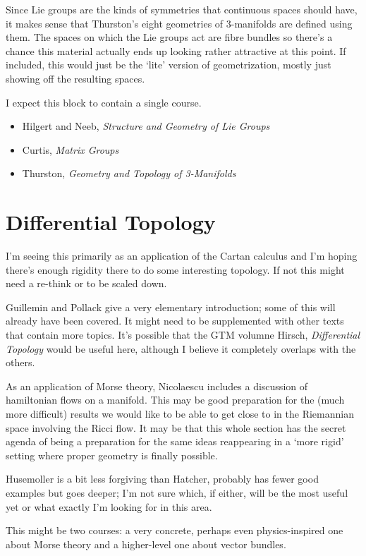\documentclass[article]{article}
\begin{document}
Since Lie groups are the kinds of symmetries that continuous spaces should have, it makes sense that Thurston's eight geometries of 3-manifolds are defined using them. The spaces on which the Lie groups act are fibre bundles so there's a chance this material actually ends up looking rather attractive at this point. If included, this would just be the `lite' version of geometrization, mostly just showing off the resulting spaces.

I expect this block to contain a single course.

\begin{itemize}
	\item[]{Hilgert and Neeb, \textit{Structure and Geometry of Lie Groups}}
	\item[]{Curtis, \textit{Matrix Groups}}
	\item[]{Thurston, \textit{Geometry and Topology of 3-Manifolds}}
\end{itemize}

\section{Differential Topology}

I'm seeing this primarily as an application of the Cartan calculus and I'm hoping there's enough rigidity there to do some interesting topology. If not this might need a re-think or to be scaled down.

Guillemin and Pollack give a very elementary introduction; some of this will already have been covered. It might need to be supplemented with other texts that contain more topics. It's possible that the GTM volumne Hirsch, \textit{Differential Topology} would be useful here, although I believe it completely overlaps with the others.

As an application of Morse theory, Nicolaescu includes a discussion of hamiltonian flows on a manifold. This may be good preparation for the (much more difficult) results we would like to be able to get close to in the Riemannian space involving the Ricci flow. It may be that this whole section has the secret agenda of being a preparation for the same ideas reappearing in a `more rigid' setting where proper geometry is finally possible.

Husemoller is a bit less forgiving than Hatcher, probably has fewer good examples but goes deeper; I'm not sure which, if either, will be the most useful yet or what exactly I'm looking for in this area.

This might be two courses: a very concrete, perhaps even physics-inspired one about Morse theory and a higher-level one about vector bundles.
\end{document}
